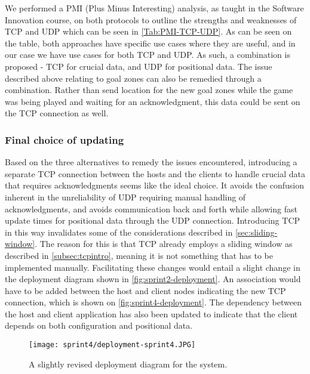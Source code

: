 We performed a PMI (Plus Minus Interesting) analysis, as taught in the Software Innovation course, on both protocols to outline the strengths and weaknesses of TCP and UDP which can be seen in \autoref{Tab:PMI-TCP-UDP}.
As can be seen on the table, both approaches have specific use cases where they are useful, and in our case we have use cases for both TCP and UDP.
As such, a combination is proposed - TCP for crucial data, and UDP for positional data.
The issue described above relating to goal zones can also be remedied through a combination.
Rather than send location for the new goal zones while the game was being played and waiting for an acknowledgment, this data could be sent on the TCP connection as well.

\subsubsection{Final choice of updating}
Based on the three alternatives to remedy the issues encountered, introducing a separate TCP connection between the hosts and the clients to handle crucial data that requires acknowledgments seems like the ideal choice.
It avoids the confusion inherent in the unreliability of UDP requiring manual handling of acknowledgments, and avoids communication back and forth while allowing fast update times for positional data through the UDP connection.
Introducing TCP in this way invalidates some of the considerations described in \autoref{sec:sliding-window}.
The reason for this is that TCP already employs a sliding window as described in \autoref{subsec:tcpintro}, meaning it is not something that has to be implemented manually.
Facilitating these changes would entail a slight change in the deployment diagram shown in \autoref{fig:sprint2-deployment}.
An association would have to be added between the host and client nodes indicating the new TCP connection, which is shown on \autoref{fig:sprint4-deployment}.
The dependency between the host and client application has also been updated to indicate that the client depends on both configuration and positional data.
\begin{figure}[H]
    \centering
    \texttt{[image: sprint4/deployment-sprint4.JPG]}
    \caption{A slightly revised deployment diagram for the system.}
    \label{fig:sprint4-deployment}
\end{figure}
\noindent
